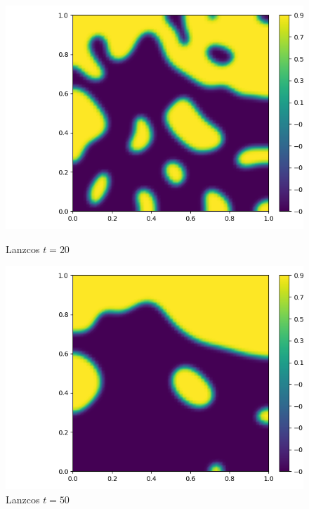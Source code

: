 \documentclass{article}
\begin{document}
\begin{figure}[H]
    \centering
    \begin{minipage}{0.5\textwidth}
       \centering
	  \includegraphics[width=\linewidth]{FEPics/Allen Cahn Test2_60x60_0.025_EXPLAN_EndTime=20.png}
	  \caption{Lanzcos $t=20$}
    \end{minipage}\hfill
    \begin{minipage}{0.5\textwidth}
       \centering
	  \includegraphics[width=\linewidth]{FEPics/Allen Cahn Test2_60x60_0.025_EXPLAN_EndTime=50.png}
	  \caption{Lanzcos $t=50$}
    \end{minipage}
\end{figure}
\end{document}
